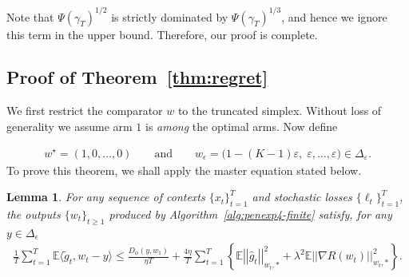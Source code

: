 \documentclass[11pt,letterpaper]{article}
\newcommand{\Exs}{\mathbb{E}}
\newcommand{\err}{\Psi(\gamma_T)}
\newcommand{\loss}{\ell}
\theoremstyle{plain}
\newtheorem{lemma}{Lemma}
\theoremstyle{definition}  %
\begin{document}
\noindent Note that $\err^{1/2}$ is strictly dominated by $\err^{1/3}$, and hence we ignore this term in the upper bound. Therefore, our proof is complete.


\subsection{Proof of Theorem~\ref{thm:regret}}
\label{sec:regret-thm-proof}

\noindent 
We first restrict the comparator $w$ to the truncated simplex. Without loss of generality we assume arm $1$ is \emph{among} the optimal arms. Now define 
%

\begin{align*}
    w^\star = (1, 0, \ldots, 0) 
    \qquad \text{and} \qquad 
    w_{\epsilon} = \big(1-(K-1)\varepsilon,\;\varepsilon,\ldots,\varepsilon\big)
  \in \Delta_\varepsilon. 
\end{align*}
%
To prove this theorem, we shall apply the master equation stated below.
\begin{lemma}
\label{thm:avg-conv}
 For any sequence of contexts $\{x_t\}_{t=1}^T$ and stochastic losses $\{\loss_t\}_{t=1}^T$, 
 the outputs $\{w_t\}_{t \geq 1}$ produced by Algorithm~\ref{alg:penexp4-finite} satisfy, for any $y \in \Delta_\epsilon$  
 \begin{align}
 \label{eqn:master-eqn}
     \frac{1}{T}\sum_{t = 1}^T \Exs \langle \widetilde{g}_t,w_t-y\rangle \le  \frac{D_\phi(y,w_1)}{\eta T} + 
     \frac{4\eta}{T} \sum_{t = 1}^T \left\lbrace 
     \Exs \left|\left|\widehat{g}_t\right|\right|_{w_t,\ast}^2 + \lambda^2\Exs \left|\left|\nabla R(w_t)\right|\right|_{w_t,\ast}^2 \right\rbrace.
 \end{align}

 \end{lemma}
\end{document}
